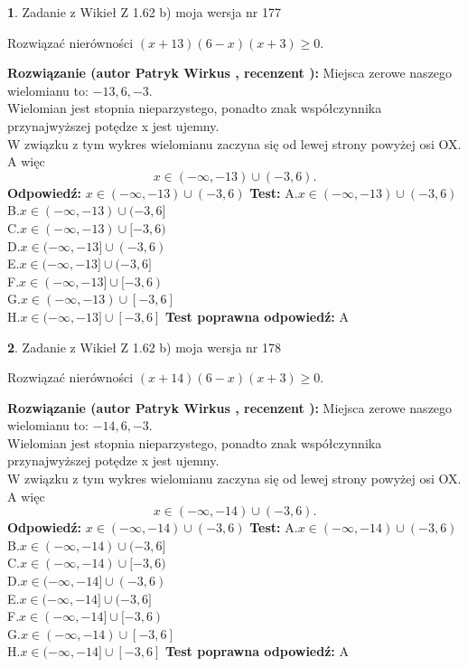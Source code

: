 \documentclass[12pt, a4paper]{article}
\theoremstyle{definition} %
\newtheorem{zad}{}
\newcommand{\zadStart}[1]{\begin{zad}#1\newline}
\newcommand{\zadStop}{\end{zad}}
\newcommand{\rozwStart}[2]{\noindent \textbf{Rozwiązanie (autor #1 , recenzent #2): }\newline}
\newcommand{\rozwStop}{\newline}
\newcommand{\odpStart}{\noindent \textbf{Odpowiedź:}\newline}
\newcommand{\odpStop}{\newline}
\newcommand{\testStart}{\noindent \textbf{Test:}\newline}
\newcommand{\testStop}{\newline}
\newcommand{\kluczStart}{\noindent \textbf{Test poprawna odpowiedź:}\newline}
\newcommand{\kluczStop}{\newline}
\begin{document}
\zadStart{Zadanie z Wikieł Z 1.62 b) moja wersja nr 177}

Rozwiązać nierówności $(x+13)(6-x)(x+3)\ge0$.
\zadStop
\rozwStart{Patryk Wirkus}{}
Miejsca zerowe naszego wielomianu to: $-13, 6, -3$.\\
Wielomian jest stopnia nieparzystego, ponadto znak współczynnika przy\linebreak najwyższej potędze x jest ujemny.\\ W związku z tym wykres wielomianu zaczyna się od lewej strony powyżej osi OX. A więc $$x \in (-\infty,-13) \cup (-3,6).$$
\rozwStop
\odpStart
$x \in (-\infty,-13) \cup (-3,6)$
\odpStop
\testStart
A.$x \in (-\infty,-13) \cup (-3,6)$\\
B.$x \in (-\infty,-13) \cup (-3,6]$\\
C.$x \in (-\infty,-13) \cup [-3,6)$\\
D.$x \in (-\infty,-13] \cup (-3,6)$\\
E.$x \in (-\infty,-13] \cup (-3,6]$\\
F.$x \in (-\infty,-13] \cup [-3,6)$\\
G.$x \in (-\infty,-13) \cup [-3,6]$\\
H.$x \in (-\infty,-13] \cup [-3,6]$
\testStop
\kluczStart
A
\kluczStop



\zadStart{Zadanie z Wikieł Z 1.62 b) moja wersja nr 178}

Rozwiązać nierówności $(x+14)(6-x)(x+3)\ge0$.
\zadStop
\rozwStart{Patryk Wirkus}{}
Miejsca zerowe naszego wielomianu to: $-14, 6, -3$.\\
Wielomian jest stopnia nieparzystego, ponadto znak współczynnika przy\linebreak najwyższej potędze x jest ujemny.\\ W związku z tym wykres wielomianu zaczyna się od lewej strony powyżej osi OX. A więc $$x \in (-\infty,-14) \cup (-3,6).$$
\rozwStop
\odpStart
$x \in (-\infty,-14) \cup (-3,6)$
\odpStop
\testStart
A.$x \in (-\infty,-14) \cup (-3,6)$\\
B.$x \in (-\infty,-14) \cup (-3,6]$\\
C.$x \in (-\infty,-14) \cup [-3,6)$\\
D.$x \in (-\infty,-14] \cup (-3,6)$\\
E.$x \in (-\infty,-14] \cup (-3,6]$\\
F.$x \in (-\infty,-14] \cup [-3,6)$\\
G.$x \in (-\infty,-14) \cup [-3,6]$\\
H.$x \in (-\infty,-14] \cup [-3,6]$
\testStop
\kluczStart
A
\kluczStop
\end{document}
